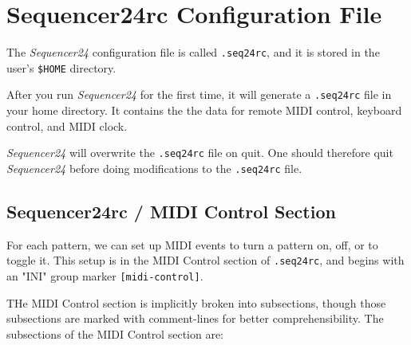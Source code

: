 %
%
%

\section{Sequencer24rc Configuration File}
\label{sec:seq24_rc_file}

   \index{[.seq24rc]}   %
   The \textsl{Sequencer24} configuration file is called
   \texttt{.seq24rc}, and it is stored in the user's \texttt{\$HOME}
   directory.

   After you run \textsl{Sequencer24} for the first time, it will generate a
   \texttt{.seq24rc} file in your home directory.
   It contains the the data for remote MIDI control, keyboard
   control, and MIDI clock.

   \textsl{Sequencer24} will overwrite the \texttt{.seq24rc} file on quit.  One
   should therefore quit \textsl{Sequencer24} before doing modifications to the
   \texttt{.seq24rc} file.

\subsection{Sequencer24rc / MIDI Control Section}
\label{subsec:seq24_rc_file_midi_control}

   For each pattern, we can set up MIDI events to turn a 
	pattern on, off, or to toggle it.  This setup is in the 
   MIDI Control section of \texttt{.seq24rc}, and begins with an
   "INI" group marker \texttt{[midi-control]}.
	
   THe MIDI Control section is implicitly broken into subsections, though those
   subsections are marked with comment-lines for better comprehensibility.
   The subsections of the MIDI Control section are:

